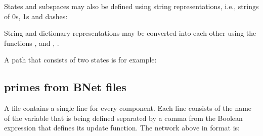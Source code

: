 \documentclass[letterpaper,10pt,english]{sphinxmanual}
\begin{document}
States and subspaces may also be defined using string representations, i.e., strings of 0s, 1s and dashes:

\begin{sphinxVerbatim}[commandchars=\\\{\}]
  
  
\end{sphinxVerbatim}

String and dictionary representations may be converted into each other using the functions
{\hyperref[\detokenize{StateTransitionGraphs:state2str}]{}}, {\hyperref[\detokenize{StateTransitionGraphs:state2dict}]{}} and {\hyperref[\detokenize{StateTransitionGraphs:subspace2str}]{}}, {\hyperref[\detokenize{StateTransitionGraphs:subspace2dict}]{}}.

A path that consists of two states is for example:

\begin{sphinxVerbatim}[commandchars=\\\{\}]
  
  
  \PYG{p}{[}\PYG{p}{]}
\end{sphinxVerbatim}


\subsection{primes from BNet files}
\label{\detokenize{Manual:primes-from-bnet-files}}\label{\detokenize{Manual:id1}}
A  file contains a single line for every component.
Each line consists of the name of the variable that is being defined separated by a comma from the Boolean expression that defines its update function.
The network above in  format is:
\end{document}
